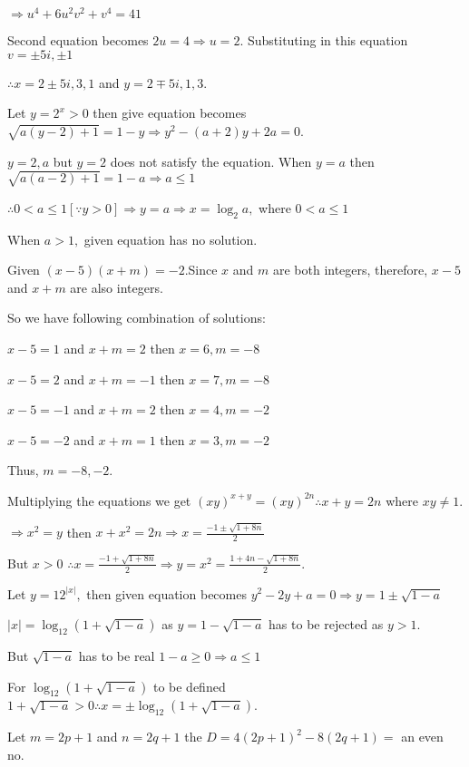   $\Rightarrow u^4 + 6u^2v^2 + v^4 = 41$

  Second equation becomes $2u = 4 \Rightarrow u = 2$. Substituting in this equation $v = \pm 5i, \pm 1$

  $\therefore x = 2 \pm 5i, 3, 1$ and $y = 2\mp 5i, 1, 3$.
\item Let $y = 2^x > 0$ then give equation becomes $\sqrt{a(y - 2) + 1} = 1 - y\Rightarrow y^2 - (a + 2)y +
  2a = 0$.

  $y = 2, a$ but $y = 2$ does not satisfy the equation. When $y = a$ then $\sqrt{a(a - 2) + 1} = 1 - a
  \Rightarrow a \le 1$

  $\therefore 0 < a \le 1 [\because y > 0]\Rightarrow y = a \Rightarrow x =\log_2 a,$ where $0 < a \le 1$

  When $a > 1,$ given equation has no solution.
\item Given $(x - 5)(x + m) = -2$.Since $x$ and $m$ are both integers, therefore, $x - 5$ and $x + m$ are
  also integers.

  So we have following combination of solutions:

  $x - 5 = 1$ and $x + m = 2$ then $x = 6, m = -8$

  $x - 5 = 2$ and $x + m = -1$ then $x = 7, m = -8$

  $x - 5 = -1$ and $x + m = 2$ then $x = 4, m = -2$

  $x - 5 = -2$ and $x + m = 1$ then $x = 3, m = -2$

  Thus, $m = -8, -2$.
\item Multiplying the equations we get $(xy)^{x + y} = (xy)^{2n} \therefore x + y = 2n$ where $xy \ne 1$.

  $\Rightarrow x^2 = y$ then $x + x^2 = 2n\Rightarrow x = \frac{-1 \pm \sqrt{1 + 8n}}{2}$

  But $x > 0$ $\therefore x = \frac{-1 + \sqrt{1 + 8n}}{2}\Rightarrow y = x^2 = \frac{1 + 4n - \sqrt{1 +
      8n}}{2}$.
\item Let $y = 12^{|x|},$ then given equation becomes $y^2 - 2y + a = 0\Rightarrow y = 1 \pm \sqrt{1 - a}$

  $|x| = \log_{12}(1 + \sqrt{1 - a})$ as $y = 1 - \sqrt{1 - a}$ has to be rejected as $y > 1$.

  But $\sqrt{1 - a}$ has to be real $1 - a \ge 0 \Rightarrow a \le 1$

  For $\log_{12}(1 + \sqrt{1 - a})$ to be defined $1 + \sqrt{1 - a} > 0\therefore x = \pm \log_{12}(1 +
  \sqrt{1 - a})$.
\item Let $m = 2p + 1$ and $n = 2q + 1$ the $D = 4(2p + 1)^2 - 8(2q + 1) =$ an even no.

